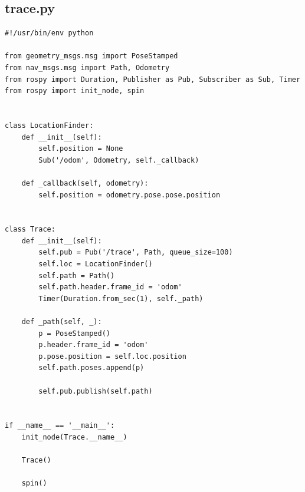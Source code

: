 \documentclass[14pt, a4paper]{extarticle}
\begin{document}
	\subsection{trace.py}
\begin{lstlisting}
#!/usr/bin/env python

from geometry_msgs.msg import PoseStamped
from nav_msgs.msg import Path, Odometry
from rospy import Duration, Publisher as Pub, Subscriber as Sub, Timer
from rospy import init_node, spin


class LocationFinder:
    def __init__(self):
        self.position = None
        Sub('/odom', Odometry, self._callback)

    def _callback(self, odometry):
        self.position = odometry.pose.pose.position


class Trace:
    def __init__(self):
        self.pub = Pub('/trace', Path, queue_size=100)
        self.loc = LocationFinder()
        self.path = Path()
        self.path.header.frame_id = 'odom'
        Timer(Duration.from_sec(1), self._path)

    def _path(self, _):
        p = PoseStamped()
        p.header.frame_id = 'odom'
        p.pose.position = self.loc.position
        self.path.poses.append(p)

        self.pub.publish(self.path)


if __name__ == '__main__':
    init_node(Trace.__name__)

    Trace()

    spin()
\end{lstlisting}
\end{document}
